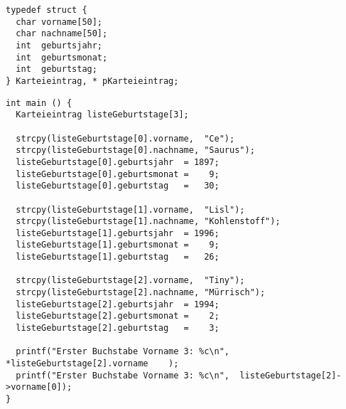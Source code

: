 \begin{codebox}
\begin{verbatim}
typedef struct {
  char vorname[50];
  char nachname[50];
  int  geburtsjahr;
  int  geburtsmonat;
  int  geburtstag;
} Karteieintrag, * pKarteieintrag;
\end{verbatim}
\end{codebox}
%
\begin{codebox}[]
\begin{verbatim}
int main () {
  Karteieintrag listeGeburtstage[3];

  strcpy(listeGeburtstage[0].vorname,  "Ce");
  strcpy(listeGeburtstage[0].nachname, "Saurus");
  listeGeburtstage[0].geburtsjahr  = 1897;
  listeGeburtstage[0].geburtsmonat =    9;
  listeGeburtstage[0].geburtstag   =   30;

  strcpy(listeGeburtstage[1].vorname,  "Lisl");
  strcpy(listeGeburtstage[1].nachname, "Kohlenstoff");
  listeGeburtstage[1].geburtsjahr  = 1996;
  listeGeburtstage[1].geburtsmonat =    9;
  listeGeburtstage[1].geburtstag   =   26;

  strcpy(listeGeburtstage[2].vorname,  "Tiny");
  strcpy(listeGeburtstage[2].nachname, "Mürrisch");
  listeGeburtstage[2].geburtsjahr  = 1994;
  listeGeburtstage[2].geburtsmonat =    2;
  listeGeburtstage[2].geburtstag   =    3;

  printf("Erster Buchstabe Vorname 3: %c\n", *listeGeburtstage[2].vorname    );
  printf("Erster Buchstabe Vorname 3: %c\n",  listeGeburtstage[2]->vorname[0]);
}
\end{verbatim}
\end{codebox}

